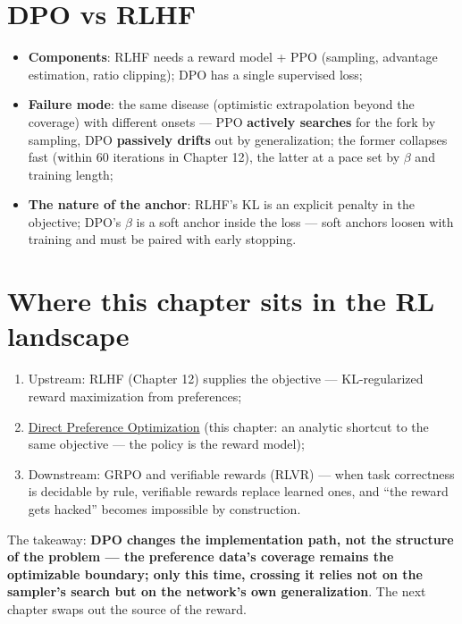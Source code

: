 \documentclass{article}
\begin{document}
\section*{DPO vs RLHF}

\begin{itemize}
  \item \textbf{Components}: RLHF needs a reward model + PPO (sampling, advantage estimation, ratio clipping); DPO has a single supervised loss;
  \item \textbf{Failure mode}: the same disease (optimistic extrapolation beyond the coverage) with different onsets --- PPO \textbf{actively searches} for the fork by sampling, DPO \textbf{passively drifts} out by generalization; the former collapses fast (within 60 iterations in Chapter 12), the latter at a pace set by $\beta$ and training length;
  \item \textbf{The nature of the anchor}: RLHF's KL is an explicit penalty in the objective; DPO's $\beta$ is a soft anchor inside the loss --- soft anchors loosen with training and must be paired with early stopping.
\end{itemize}

\section*{Where this chapter sits in the RL landscape}

\begin{enumerate}
  \item Upstream: RLHF (Chapter 12) supplies the objective --- KL-regularized reward maximization from preferences;
  \item \underline{Direct Preference Optimization} (this chapter: an analytic shortcut to the same objective --- the policy is the reward model);
  \item Downstream: GRPO and verifiable rewards (RLVR) --- when task correctness is decidable by rule, verifiable rewards replace learned ones, and ``the reward gets hacked'' becomes impossible by construction.
\end{enumerate}

The takeaway: \textbf{DPO changes the implementation path, not the structure of the problem --- the preference data's coverage remains the optimizable boundary; only this time, crossing it relies not on the sampler's search but on the network's own generalization}. The next chapter swaps out the source of the reward.
\end{document}
